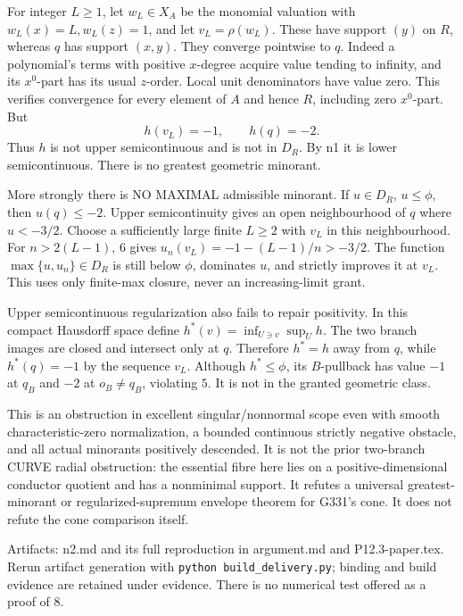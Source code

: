 \documentclass[11pt]{article}
\begin{document}
For integer \(L\ge1\), let \(w_L\in X_A\) be the monomial valuation with \(w_L(x)=L,w_L(z)=1\), and let \(v_L=\rho(w_L)\). These have support \((y)\) on \(R\), whereas \(q\) has support \((x,y)\). They converge pointwise to \(q\). Indeed a polynomial's terms with positive \(x\)-degree acquire value tending to infinity, and its \(x^0\)-part has its usual \(z\)-order. Local unit denominators have value zero. This verifies convergence for every element of \(A\) and hence \(R\), including zero \(x^0\)-part. But
\[
h(v_L)=-1,\qquad h(q)=-2.
\]
Thus \(h\) is not upper semicontinuous and is not in \(D_R\). By n1 it is lower semicontinuous. There is no greatest geometric minorant.

More strongly there is NO MAXIMAL admissible minorant. If \(u\in D_R\), \(u\le\phi\), then \(u(q)\le-2\). Upper semicontinuity gives an open neighbourhood of \(q\) where \(u<-3/2\). Choose a sufficiently large finite \(L\ge2\) with \(v_L\) in this neighbourhood. For \(n>2(L-1)\), \(6\) gives \(u_n(v_L)=-1-(L-1)/n>-3/2\). The function \(\max\{u,u_n\}\in D_R\) is still below \(\phi\), dominates \(u\), and strictly improves it at \(v_L\). This uses only finite-max closure, never an increasing-limit grant.

Upper semicontinuous regularization also fails to repair positivity. In this compact Hausdorff space define \(h^*(v)=\inf_{U\ni v}\sup_Uh\). The two branch images are closed and intersect only at \(q\). Therefore \(h^*=h\) away from \(q\), while \(h^*(q)=-1\) by the sequence \(v_L\). Although \(h^*\le\phi\), its \(B\)-pullback has value \(-1\) at \(q_B\) and \(-2\) at \(o_B\ne q_B\), violating \(5\). It is not in the granted geometric class.

This is an obstruction in excellent singular/nonnormal scope even with smooth characteristic-zero normalization, a bounded continuous strictly negative obstacle, and all actual minorants positively descended. It is not the prior two-branch CURVE radial obstruction: the essential fibre here lies on a positive-dimensional conductor quotient and has a nonminimal support. It refutes a universal greatest-minorant or regularized-supremum envelope theorem for G331's cone. It does not refute the cone comparison itself.

Artifacts: n2.md and its full reproduction in argument.md and P12.3-paper.tex. Rerun artifact generation with \texttt{python build\_delivery.py}; binding and build evidence are retained under evidence. There is no numerical test offered as a proof of \(8\).
\end{document}
